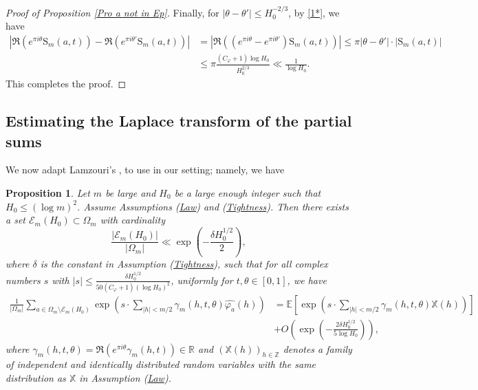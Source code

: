 \documentclass[12pt]{amsart}
\newtheorem{pro}[thm]{Proposition}
\theoremstyle{definition}
\numberwithin{equation}{section}
\numberwithin{equation}{section}
\def\E{\mathbb{E}}
\def\Ecal{\mathcal{E}}
\def\R{\mathbb{R}}
\def\Z{\mathbb{Z}}
\def\B{\mathrm{S}}
\def\Mp{C_\varphi}
\def\X{\mathbb{X}}
\def\E{\mathbb{E}}
\begin{document}
\begin{proof}[Proof of Proposition \ref{Pro a not in Ep}]
Finally, for $|\theta-\theta'|\leq H_0^{-2/3}$, by \eqref{1*}, we have
\begin{align*}
\left|\Re\left(e^{\pi i\theta}\B_m(a,t)\right)-\Re\left(e^{\pi i\theta'}\B_m(a,t)\right)\right|
&=
\left|\Re\left((e^{\pi i\theta}-e^{\pi i\theta'})\B_m(a,t)\right)\right|
\leq
\pi |\theta-\theta'|\cdot 
\left|\B_m(a,t)\right|\\
&\leq
\pi \frac{(\Mp +1)\log H_0 }{H_0^{2/3}}
\ll \frac{1}{\log H_0}.
\end{align*}
This completes the proof.
\end{proof}


\subsection{Estimating the Laplace transform of the partial sums}


We now adapt Lamzouri's  \cite[Proposition 7.2]{Lam20}, to use in our setting; namely, we have

\begin{pro}\label{pro 7.2 adapted H_0}
Let $m$ be large and $H_0$ be a large enough integer such that $H_0\leq (\log m)^2$. Assume Assumptions (\hyperlink{Ass Law}{Law}) and (\hyperlink{Ass Tightness}{Tightness}). Then there exists a set $\Ecal_m(H_0) \subset \Omega_m$ with cardinality
$$\frac{|\Ecal_m(H_0)|}{|\Omega_m|} \ll \exp\left(-\frac{\delta H_0^{1/2}}{2}\right),$$ 
where $\delta $ is the constant in Assumption (\hyperlink{Ass Tightness}{Tightness}), such that for all complex numbers $s$ with $|s| \leq \frac{\delta H_0^{1/2}}{50(\Mp+1)(\log H_0)^2}$, uniformly for $t,\theta\in [0,1]$, we have
\begin{align*}
    \frac{1}{|\Omega_m|} \sum_{
a\in \Omega_m\setminus \Ecal_m(H_0)}
\exp
\left(
s \cdot \sum_{|h|< m/2}
\gamma_m(h,t,\theta)\widehat{\varphi_a}(h)
\right)
&= \E \left[\exp \left(s \cdot \sum_{|h|< m/2} \gamma_m(h,t,\theta)\X(h)\right) \right]\\
&+ O \left(\exp \left(
-\frac{2\delta H_0^{1/2}}{5\log H_0}
\right)\right),
\end{align*}
where $\gamma_m(h,t,\theta) = \Re\left(e^{\pi i \theta } \gamma_m(h,t)\right) \in\R$ and $(\X(h))_{h\in\Z}$ denotes a family of independent and identically distributed random variables with the same distribution as $\X$ in Assumption (\hyperlink{Ass Law}{Law}).
\end{pro}
\end{document}
